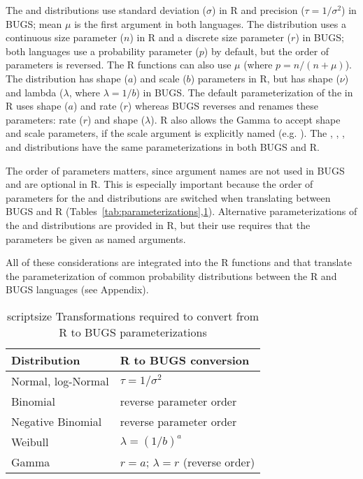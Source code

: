   The  and  distributions use standard deviation ($\sigma$) in R and precision ($\tau=1/\sigma^2$) in BUGS; mean $\mu$ is the first argument in both languages.
  The  distribution uses a continuous size parameter ($n$) in R and a discrete size parameter ($r$) in BUGS; both languages use a probability parameter ($p$) by default, but the order of parameters is reversed. 
  The R functions  can also use $\mu$ (where $p=n/(n+\mu)$).
  The  distribution has shape ($a$) and scale ($b$) parameters in R, but has shape ($\nu$) and lambda ($\lambda$, where $\lambda=1/b$) in BUGS.
  The default parameterization of the  in R uses shape ($a$) and rate ($r$) whereas BUGS reverses and renames these parameters: rate ($r$) and shape ($\lambda$).
  R also allows the Gamma to accept shape and scale parameters, if the scale argument is explicitly named (e.g. ).
  The , , , and  distributions have the same parameterizations in both BUGS and R.

  The order of parameters matters, since argument names are not used in BUGS and are optional in R.
  This is especially important because the order of parameters for the  and  distributions are switched when translating between BUGS and R (Tables~\ref{tab:parameterizations},\ref{tab:transformations}).
  Alternative parameterizations of the  and  distributions are provided in R, but their use requires that the parameters be given as named arguments.

 All of these considerations are integrated into the R functions  and  that translate the parameterization of common probability distributions between the R and BUGS languages (see Appendix).

\begin{table}
{\scriptsize
\begin{tabular}{ll}
\hline
 Distribution        &  R to BUGS conversion                      \\
\hline
 Normal, log-Normal  &  $\tau = 1/\sigma^2$                   \\
 Binomial            &  reverse parameter order                \\
 Negative Binomial   &  reverse parameter order \\
 Weibull             &  $\lambda = (1/b)^{a}$  \\
 Gamma               &  $r = a$; $\lambda = r$ (reverse order)                           \\
\hline
\end{tabular}
}
\caption{scriptsize Transformations required to convert from R to BUGS parameterizations}
\label{tab:transformations}
\end{table}

